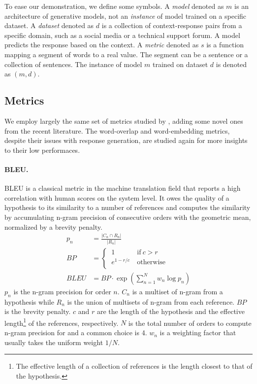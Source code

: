 \documentclass[runningheads]{llncs}
\begin{document}
    To ease our demonstration, we define some symbols. A \emph{model} denoted as $m$ is an architecture of generative models, not an \emph{instance} of model trained on a specific dataset. A \emph{dataset} denoted as $d$ is a collection of context-response pairs from a specific domain, such as a social media or a technical support forum. A model predicts the response based on the context. A \emph{metric} denoted as $s$ is a function mapping a segment of words to a real value. The segment can be a sentence or a collection of sentences. The instance of model $m$ trained on dataset $d$ is denoted as $(m, d)$.

    \subsection{Metrics}
    We employ largely the same set of metrics studied by \cite{HowNot}, adding some novel ones from the recent literature. The word-overlap and word-embedding metrics, despite their issues with response generation, are studied again for more insights to their low performaces.

    \paragraph{BLEU.}
    BLEU \cite{BLEU} is a classical metric in the machine translation field that reports a high correlation with human scores on the system level. It owes the quality of a hypothesis to its similarity to a number of references and computes the similarity by accumulating n-gram precision of consecutive orders with the geometric mean, normalized by a brevity penalty.
    \begin{align}
        p_n &= \frac{ |C_n \cap R_n| }{ |R_n| } \\
        \textit{BP} &=
        \begin{cases}
            \ 1 \ & \text{if} \  c > r \\
            \ e^{1 - r/c} \ & \text{otherwise} \\
        \end{cases} \\
        \textit{BLEU} &=
        \textit{BP} \cdot \exp \left( \sum_{n=1}^N w_n \log p_n \right)
    \end{align}
    $p_n$ is the n-gram precision for order $n$. $C_n$ is a multiset of n-gram from a hypothesis while $R_n$ is the union of multisets of n-gram from each reference. $\textit{BP}$ is the brevity penalty. $c$ and $r$ are the length of the hypothesis and the effective length\footnote{The effective length of a collection of references is the length closest to that of the hypothesis.} of the references, respectively. $N$ is the total number of orders to compute n-gram precision for and a common choice is 4. $w_n$ is a weighting factor that usually takes the uniform weight $1 / N$.
\end{document}
